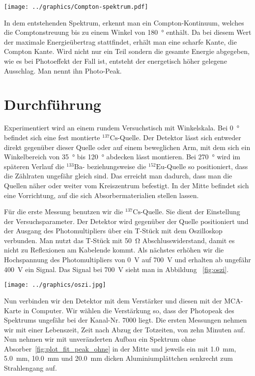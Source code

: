\documentclass[11pt, ngerman, fleqn, DIV=15, headinclude, BCOR=2cm]{scrreprt}
\begin{document}
\texttt{[image: ../graphics/Compton-spektrum.pdf]}
\parencite{comptoneffekt}

In dem entstehenden Spektrum, erkennt man ein Compton-Kontinuum, welches die 
Comptonstreuung bis zu einem Winkel von \SI{180}{\degree} enthält. Da bei diesem
Wert der maximale Energieübertrag stattfindet, erhält man eine scharfe Kante, 
die Compton Kante. Wird nicht nur ein Teil sondern die gesamte Energie abgegeben, wie es bei 
Photoeffekt der Fall ist, entsteht der energetisch höher gelegene Ausschlag. Man 
nennt ihn Photo-Peak.


\chapter{Durchführung}
Experimentiert wird an einem rundem Versuchstisch mit Winkelskala.
Bei \SI{0}{\degree} befindet sich eine fest montierte
$^{137}\text{Cs}$-Quelle. Der Detektor lässt sich entweder direkt gegenüber
dieser Quelle oder auf einem beweglichen Arm, mit dem sich ein Winkelbereich
von \SI{35}{\degree} bis \SI{120}{\degree} abdecken lässt montieren. Bei
\SI{270}{\degree} wird im späteren Verlauf die $^{133}\text{Ba}$- beziehungsweise die
$^{152}\text{Eu}$-Quelle so positioniert, dass die Zählraten ungefähr gleich
sind. Das erreicht man dadurch, dass man die Quellen näher oder weiter vom
Kreiszentrum befestigt. 
In der Mitte befindet sich eine Vorrichtung, auf die sich Absorbermaterialien stellen lassen.

Für die erste Messung benutzen wir die $^{137}\text{Cs}$-Quelle. Sie dient der
Einstellung der Versuchsparameter. Der Detektor wird gegenüber der Quelle
positioniert und der Ausgang des Photomultipliers über ein T-Stück mit dem
Oszilloskop verbunden. Man nutzt das T-Stück mit \SI{50}{\ohm}
Abschlusswiderstand, damit es nicht zu Reflexionen
am Kabelende kommt. Als nächstes erhöhen wir die Hochspannung des
Photomultipliers von \SI{0}{\volt} auf \SI{700}{\volt} und erhalten ab ungefähr
\SI{400}{\volt} ein Signal. Das Signal bei \SI{700}{\volt} sieht man in
Abbildung ~\ref{fig:oszi}.

\texttt{[image: ../graphics/oszi.jpg]}\label{fig:oszi}

Nun verbinden wir den Detektor mit dem Verstärker und diesen mit der MCA-Karte
in Computer. Wir wählen die Verstärkung so, dass der Photopeak des Spektrums
ungefähr bei der Kanal-Nr. 7000 liegt. Die ersten Messungen nehmen wir mit
einer Lebenszeit, Zeit nach Abzug der Totzeiten, von zehn Minuten auf.
Nun nehmen wir mit unveränderten Aufbau ein Spektrum ohne Absorber~\ref{fig:plot_fit_peak_ohne} in der Mitte
und jeweils ein mit \SI{1,0}{\milli\meter}, \SI{5,0}{\milli\meter},
\SI{10,0}{\milli\meter} und \SI{20,0}{\milli\meter} dicken Aluminiumplättchen
senkrecht zum Strahlengang auf.
\end{document}
